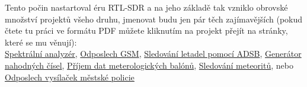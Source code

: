 \documentclass{ctuthesis}
\begin{document}
Tento počin nastartoval éru RTL-SDR a na jeho základě tak vzniklo obrovské množství projektů všeho druhu, jmenovat budu jen pár těch zajímavějších (pokud čtete tu práci ve formátu PDF můžete kliknutím na projekt přejít na stránky, které se mu věnují):\\ \href{https://www.rtl-sdr.com/rtl-sdr-used-as-a-spectrum-analyzer/}{Spektrální analyzér}, \href{https://www.rtl-sdr.com/rtl-sdr-tutorial-analyzing-gsm-with-airprobe-and-wireshark/}{Odposlech GSM}, \href{https://www.rtl-sdr.com/adsb-aircraft-radar-with-rtl-sdr/}{Sledování letadel pomocí ADSB}, \href{https://www.rtl-sdr.com/using-rtl-sdr-cheap-entropy-source/}{Generátor nahodných čísel}, \href{https://www.rtl-sdr.com/receiving-weather-balloon-data-with-rtl-sdr/}{Příjem dat meterologických balónů}, \href{https://www.rtl-sdr.com/meteor-reflection-observations-with-rtl-sdr/}{Sledování meteoritů}, nebo \href{https://technet.idnes.cz/odposlech-site-tetra-a-mestske-policie-dhy-/tec_technika.aspx?c=A160913_145939_tec_technika_vse}{Odposlech vysílaček městské policie}\\
\end{document}
